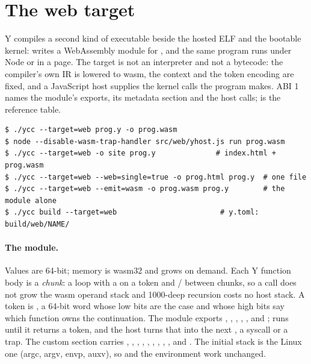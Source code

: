 \section{The web target}
\label{sec:web}

\textsf{Y} compiles a second kind of executable beside the hosted ELF and
the bootable kernel:  writes a WebAssembly module for
, and the same program runs under Node or in a page.  The target is
not an interpreter and not a bytecode: the compiler's own IR is lowered to
wasm, the context and the token encoding are fixed, and a JavaScript host
supplies the kernel calls the program makes.  ABI 1 names the module's
exports, its metadata section and the host calls;  is the
reference table.

\begin{lstlisting}
$ ./ycc --target=web prog.y -o prog.wasm
$ node --disable-wasm-trap-handler src/web/yhost.js run prog.wasm
$ ./ycc --target=web -o site prog.y              # index.html + prog.wasm
$ ./ycc --target=web --web=single=true -o prog.html prog.y  # one file
$ ./ycc --target=web --emit=wasm -o prog.wasm prog.y        # the module alone
$ ./ycc build --target=web                        # y.toml: build/web/NAME/
\end{lstlisting}

\paragraph{The module.} Values are 64-bit; memory is wasm32 and grows on
demand.  Each Y function body is a \emph{chunk}: a loop with a 
on a token and / between chunks,
so a call does not grow the wasm operand stack and 1000-deep recursion costs
no host stack.  A token is , a
64-bit word whose low bits are the case and whose high bits say which
function owns the continuation.  The module exports ,
, , ,
,  and ; 
runs until it returns a token, and the host turns that into the next
, a syscall or a trap.  The custom section  carries
, , , , ,
, , , ,  and
.  The initial stack is the Linux one (argc, argv, envp, auxv), so
 and the environment work unchanged.

